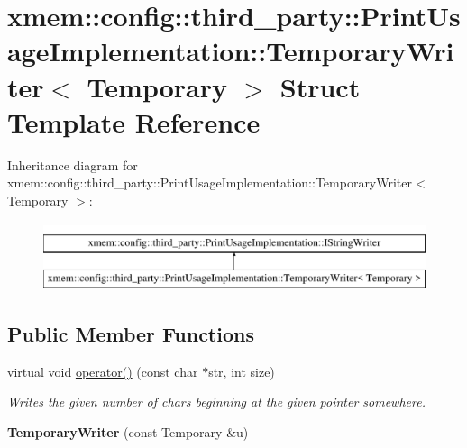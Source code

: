 \hypertarget{structxmem_1_1config_1_1third__party_1_1_print_usage_implementation_1_1_temporary_writer}{}\section{xmem\+:\+:config\+:\+:third\+\_\+party\+:\+:Print\+Usage\+Implementation\+:\+:Temporary\+Writer$<$ Temporary $>$ Struct Template Reference}
\label{structxmem_1_1config_1_1third__party_1_1_print_usage_implementation_1_1_temporary_writer}
Inheritance diagram for xmem\+:\+:config\+:\+:third\+\_\+party\+:\+:Print\+Usage\+Implementation\+:\+:Temporary\+Writer$<$ Temporary $>$\+:\begin{figure}[H]
\begin{center}
\leavevmode
\includegraphics[height=2.000000cm]{structxmem_1_1config_1_1third__party_1_1_print_usage_implementation_1_1_temporary_writer}
\end{center}
\end{figure}
\subsection*{Public Member Functions}
\begin{DoxyCompactItemize}
\item 
\hypertarget{structxmem_1_1config_1_1third__party_1_1_print_usage_implementation_1_1_temporary_writer_a0498e8ecbdacb8d62612ed353baef8a4}{}virtual void \hyperlink{structxmem_1_1config_1_1third__party_1_1_print_usage_implementation_1_1_temporary_writer_a0498e8ecbdacb8d62612ed353baef8a4}{operator()} (const char $\ast$str, int size)\label{structxmem_1_1config_1_1third__party_1_1_print_usage_implementation_1_1_temporary_writer_a0498e8ecbdacb8d62612ed353baef8a4}

\begin{DoxyCompactList}\small\item\em Writes the given number of chars beginning at the given pointer somewhere. \end{DoxyCompactList}\item 
\hypertarget{structxmem_1_1config_1_1third__party_1_1_print_usage_implementation_1_1_temporary_writer_a72507591866203f8f9fce1d565f24859}{}{\bfseries Temporary\+Writer} (const Temporary \&u)\label{structxmem_1_1config_1_1third__party_1_1_print_usage_implementation_1_1_temporary_writer_a72507591866203f8f9fce1d565f24859}

\end{DoxyCompactItemize}
